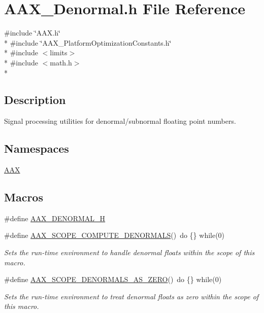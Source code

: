 \hypertarget{a00201}{}\section{A\+A\+X\+\_\+\+Denormal.\+h File Reference}
\label{a00201}
{\ttfamily \#include \char`\"{}A\+A\+X.\+h\char`\"{}}\\*
{\ttfamily \#include \char`\"{}A\+A\+X\+\_\+\+Platform\+Optimization\+Constants.\+h\char`\"{}}\\*
{\ttfamily \#include $<$limits$>$}\\*
{\ttfamily \#include $<$math.\+h$>$}\\*


\subsection{Description}
Signal processing utilities for denormal/subnormal floating point numbers. 

\subsection*{Namespaces}
\begin{DoxyCompactItemize}
\item 
 \hyperlink{a00288}{A\+A\+X}
\end{DoxyCompactItemize}
\subsection*{Macros}
\begin{DoxyCompactItemize}
\item 
\#define \hyperlink{a00201_aebb709c3232ca8ebe6ea366ca8391dad}{A\+A\+X\+\_\+\+D\+E\+N\+O\+R\+M\+A\+L\+\_\+\+H}
\item 
\#define \hyperlink{a00201_ad45309abfd0e2faa7a28c9ed753f7806}{A\+A\+X\+\_\+\+S\+C\+O\+P\+E\+\_\+\+C\+O\+M\+P\+U\+T\+E\+\_\+\+D\+E\+N\+O\+R\+M\+A\+L\+S}()~do \{\} while(0)
\begin{DoxyCompactList}\small\item\em Sets the run-\/time environment to handle denormal floats within the scope of this macro. \end{DoxyCompactList}\item 
\#define \hyperlink{a00201_aeb63901cb0661447fb69b6d10f5f1cba}{A\+A\+X\+\_\+\+S\+C\+O\+P\+E\+\_\+\+D\+E\+N\+O\+R\+M\+A\+L\+S\+\_\+\+A\+S\+\_\+\+Z\+E\+R\+O}()~do \{\} while(0)
\begin{DoxyCompactList}\small\item\em Sets the run-\/time environment to treat denormal floats as zero within the scope of this macro. \end{DoxyCompactList}\end{DoxyCompactItemize}
